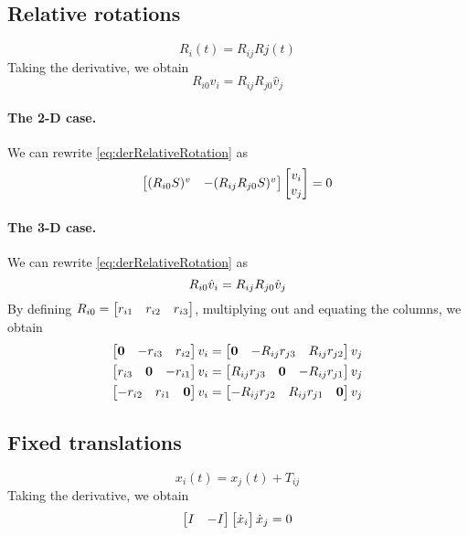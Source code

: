 \documentclass[12pt]{article}
\newcommand{\dx}{\dot{x}}
\begin{document}
\subsection{Relative rotations}
\begin{equation}
  R_i(t)=R_{ij}Rj(t)  
\end{equation}
Taking the derivative, we obtain
\begin{equation}
  \label{eq:derRelativeRotation}
  R_{i0}\hat{v}_i=R_{ij} R_{j0} \hat{v}_j  
\end{equation}
\paragraph{The 2-D case.} We can rewrite \eqref{eq:derRelativeRotation} as
\begin{equation}
  \begin{bmatrix}(R_{i0}S) ^v & -(R_{ij}R_{j0}S)^v\end{bmatrix}\begin{bmatrix}v_i\\v_j\end{bmatrix}=0
\end{equation}
\paragraph{The 3-D case.} We can rewrite \eqref{eq:derRelativeRotation} as
\begin{equation}
  R_{i0}\hat{v}_i=R_{ij} R_{j0} \hat{v}_j
\end{equation}
By defining $R_{i0}=\begin{bmatrix}r_{i1} & r_{i2} & r_{i3}\end{bmatrix}$, multiplying out and equating the columns, we obtain
\begin{equation}
\begin{aligned}
  \begin{bmatrix}\boldsymbol{0} & -r_{i3} & r_{i2}\end{bmatrix}v_i&=   \begin{bmatrix}\boldsymbol{0} & -R_{ij} r_{j3} & R_{ij} r_{j2}\end{bmatrix}v_j\\
  \begin{bmatrix}r_{i3} & \boldsymbol{0} & -r_{i1}\end{bmatrix}v_i&=   \begin{bmatrix}R_{ij} r_{j3} & \boldsymbol{0} & -R_{ij} r_{j1}\end{bmatrix}v_j\\
  \begin{bmatrix}-r_{i2} & r_{i1} & \boldsymbol{0}\end{bmatrix}v_i&=   \begin{bmatrix}-R_{ij} r_{j2} & R_{ij} r_{j1} & \boldsymbol{0}\end{bmatrix}v_j
\end{aligned}
\end{equation}
\subsection{Fixed translations}
\begin{equation}
  x_i(t)=x_j(t)+T_{ij}
\end{equation}
Taking the derivative, we obtain
\begin{equation}
  \bmat{I & -I}\bmat{\dx_i}{\dx_j}=0  
\end{equation}
\end{document}

